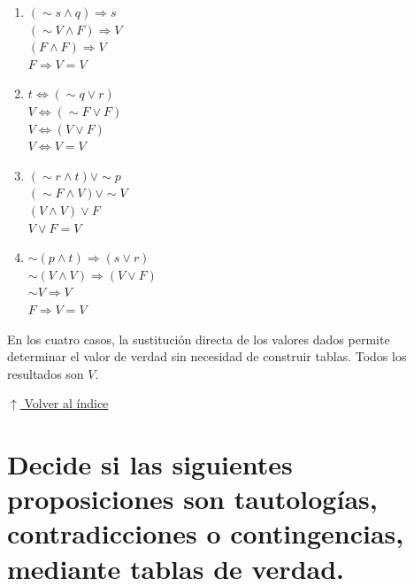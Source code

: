 \documentclass[12pt]{article}
\newcommand{\volverindice}{%
    \vspace{1em}%
    \begin{flushright}%
        \hyperlink{indice}{\small $\uparrow$ Volver al índice}%
    \end{flushright}%
}
\begin{document}
\begin{enumerate}[label=\alph*.-]
    \item $(\sim s \wedge q) \Rightarrow s$\\
          $(\sim V \wedge F) \Rightarrow V$\\
          $(F \wedge F) \Rightarrow V$\\
          $F \Rightarrow V = V$

    \item $t \Leftrightarrow (\sim q \vee r)$\\
          $V \Leftrightarrow (\sim F \vee F)$\\
          $V \Leftrightarrow (V \vee F)$\\
          $V \Leftrightarrow V = V$

    \item $(\sim r \wedge t) \vee \sim p$\\
          $(\sim F \wedge V) \vee \sim V$\\
          $(V \wedge V) \vee F$\\
          $V \vee F = V$

    \item $\sim(p \wedge t) \Rightarrow (s \vee r)$\\
          $\sim(V \wedge V) \Rightarrow (V \vee F)$\\
          $\sim V \Rightarrow V$\\
          $F \Rightarrow V = V$
\end{enumerate}

En los cuatro casos, la sustitución directa de los valores dados permite determinar el valor de verdad sin necesidad de construir tablas. Todos los resultados son $V$.

\volverindice
\newpage


\section[Tautologías, contradicciones y contingencias]{Decide si las siguientes proposiciones son tautologías, contradicciones o contingencias, mediante tablas de verdad.}
\end{document}
